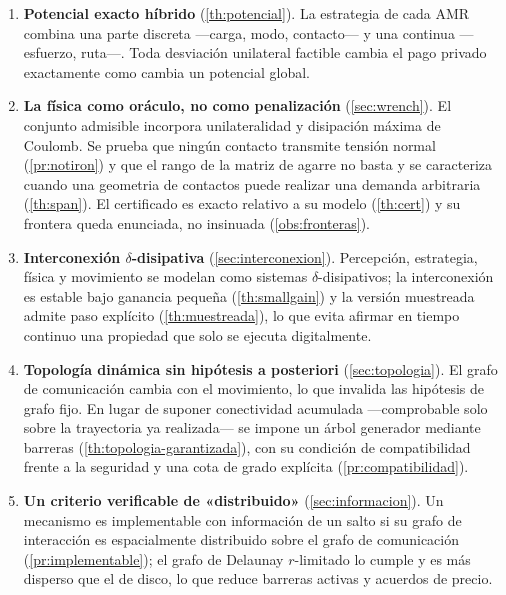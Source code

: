 \documentclass[11pt,a4paper]{article}
\theoremstyle{plain}
\theoremstyle{definition}
\theoremstyle{remark}
\begin{document}
\begin{enumerate}[leftmargin=1.9em,itemsep=0.35em]
  \item \textbf{Potencial exacto híbrido} (\cref{th:potencial}). La estrategia
  de cada AMR combina una parte discreta —carga, modo, contacto— y una continua
  —esfuerzo, ruta—. Toda desviación unilateral factible cambia el pago privado
  exactamente como cambia un potencial global.

  \item \textbf{La física como oráculo, no como penalización}
  (\cref{sec:wrench}). El conjunto admisible incorpora unilateralidad y
  disipación máxima de Coulomb. Se prueba que ningún contacto transmite tensión
  normal (\cref{pr:notiron}) y que el rango de la matriz de agarre no basta
  y se caracteriza cuando una geometria de contactos
  puede realizar una demanda arbitraria (\cref{th:span}). El certificado es exacto relativo a su modelo
  (\cref{th:cert}) y su frontera queda enunciada, no insinuada
  (\cref{obs:fronteras}).

  \item \textbf{Interconexión $\delta$-disipativa} (\cref{sec:interconexion}).
  Percepción, estrategia, física y movimiento se modelan como sistemas
  $\delta$-disipativos; la interconexión es estable bajo ganancia pequeña
  (\cref{th:smallgain}) y la versión muestreada admite paso explícito
  (\cref{th:muestreada}), lo que evita afirmar en tiempo continuo una propiedad
  que solo se ejecuta digitalmente.

  \item \textbf{Topología dinámica sin hipótesis a posteriori}
  (\cref{sec:topologia}). El grafo de comunicación cambia con el movimiento, lo
  que invalida las hipótesis de grafo fijo. En lugar de suponer conectividad
  acumulada —comprobable solo sobre la trayectoria ya realizada— se impone un
  árbol generador mediante barreras (\cref{th:topologia-garantizada}), con su
  condición de compatibilidad frente a la seguridad y una cota de grado
  explícita (\cref{pr:compatibilidad}).

  \item \textbf{Un criterio verificable de «distribuido»}
  (\cref{sec:informacion}). Un mecanismo es implementable con información de un
  salto si su grafo de interacción es espacialmente distribuido sobre el grafo
  de comunicación (\cref{pr:implementable}); el grafo de Delaunay $r$-limitado
  lo cumple y es más disperso que el de disco, lo que reduce barreras activas y
  acuerdos de precio.


\end{enumerate}
\end{document}
